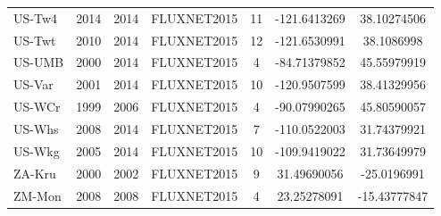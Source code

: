 \begin{center}
\begin{longtable}{lcccccc}
US-Tw4 & 2014 & 2014 & FLUXNET2015 & 11     & -121.6413269 & 38.10274506  \\
US-Twt & 2010 & 2014 & FLUXNET2015 & 12     & -121.6530991 & 38.1086998   \\
US-UMB & 2000 & 2014 & FLUXNET2015 & 4      & -84.71379852 & 45.55979919  \\
US-Var & 2001 & 2014 & FLUXNET2015 & 10     & -120.9507599 & 38.41329956  \\
US-WCr & 1999 & 2006 & FLUXNET2015 & 4      & -90.07990265 & 45.80590057  \\
US-Whs & 2008 & 2014 & FLUXNET2015 & 7      & -110.0522003 & 31.74379921  \\
US-Wkg & 2005 & 2014 & FLUXNET2015 & 10     & -109.9419022 & 31.73649979  \\
ZA-Kru & 2000 & 2002 & FLUXNET2015 & 9      & 31.49690056  & -25.0196991  \\
ZM-Mon & 2008 & 2008 & FLUXNET2015 & 4      & 23.25278091  & -15.43777847 \\ 
\end{longtable}
\end{center}

